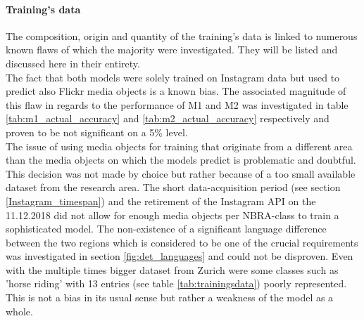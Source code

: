\paragraph*{Training's data} The composition, origin and quantity of the training's data is linked to numerous known flaws of which the majority were investigated. They will be listed and discussed here in their entirety. \\
The fact that both models were solely trained on Instagram data but used to predict also Flickr media objects is a known bias. The associated magnitude of this flaw in regards to the performance of M1 and M2 was investigated in table \ref{tab:m1_actual_accuracy} and \ref{tab:m2_actual_accuracy} respectively and proven to be not significant on a 5\% level. \\
The issue of using media objects for training that originate from a different area than the media objects on which the models predict is problematic and doubtful. This decision was not made by choice but rather because of a too small available dataset from the research area. The short data-acquisition period (see section \ref{Instagram_timespan}) and the retirement of the Instagram API on the 11.12.2018 did not allow for enough media objects per NBRA-class to train a sophisticated model. The non-existence of a significant language difference between the two regions which is considered to be one of the crucial requirements was investigated in section \ref{fig:det_languages} and could not be disproven.
Even with the multiple times bigger dataset from Zurich were some classes such as 'horse riding' with 13 entries (see table \ref{tab:trainingsdata}) poorly represented. This is not a bias in its usual sense but rather a weakness of the model as a whole.

